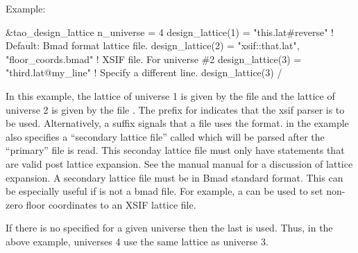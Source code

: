 Example:
\begin{example}
  &tao_design_lattice
    n_universe = 4
    design_lattice(1) = "this.lat#reverse"  ! Default: Bmad format lattice file.
    design_lattice(2) = "xsif::that.lat", "floor_coords.bmad"
                                            ! XSIF file. For universe \#2 
    design_lattice(3) = "third.lat@my_line"     ! Specify a different line.
    design_lattice(3)%
  /
\end{example}
In this example, the lattice of universe 1 is given by the file
 and the lattice of universe 2 is given by the file
. The  prefix for 
indicates that the xsif parser is to be used. Alternatively, a
 suffix signals that a file uses the 
format. 
 in the example also specifies a ``secondary
lattice file'' called  which will be parsed
after the ``primary''  file is read. This seconday
lattice file must only have statements that are valid post lattice
expansion.  See the \bmad manual manual for a discussion of lattice
expansion. A secondary lattice file must be in Bmad standard
format. This can be especially useful if  is not a
bmad file. For example, a  can be used to set
non-zero floor coordinates to an XSIF lattice file. 

If there is no  specified for a given universe then
the last  is used. Thus, in the above example,
universes 4 use the same lattice as universe 3.

